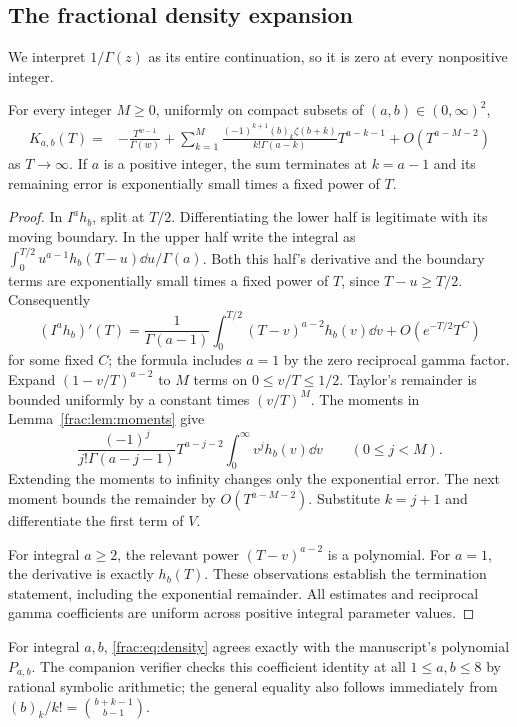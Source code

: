 \subsection{The fractional density expansion}

We interpret $1/\Gamma(z)$ as its entire continuation, so it is zero
at every nonpositive integer.

\begin{theorem}\label{frac:thm:density}
For every integer $M\ge0$, uniformly on compact subsets of
$(a,b)\in(0,\infty)^2$,
\begin{align}\label{frac:eq:density}
 K_{a,b}(T)={}&-\frac{T^{w-1}}{\Gamma(w)}
 +\sum_{k=1}^M
 \frac{(-1)^{k+1}(b)_k\zeta(b+k)}{k!\Gamma(a-k)}T^{a-k-1}
 +O(T^{a-M-2})
\end{align}
as $T\to\infty$. If $a$ is a positive integer, the sum terminates
at $k=a-1$ and its remaining error is exponentially small times
a fixed power of $T$.
\end{theorem}
\begin{proof}
In $I^ah_b$, split at $T/2$. Differentiating the lower half is
legitimate with its moving boundary. In the upper half write the
integral as $\int_0^{T/2}u^{a-1}h_b(T-u)\dd u/\Gamma(a)$.
Both this half's derivative and the boundary terms are exponentially
small times a fixed power of $T$, since $T-u\ge T/2$. Consequently
\[
 (I^ah_b)'(T)=\frac1{\Gamma(a-1)}
     \int_0^{T/2}(T-v)^{a-2}h_b(v)\dd v
       +O(e^{-T/2}T^C)
\]
for some fixed $C$; the formula includes $a=1$ by the zero reciprocal
gamma factor. Expand $(1-v/T)^{a-2}$ to $M$ terms on $0\le v/T\le1/2$.
Taylor's remainder is bounded uniformly by a constant times
$(v/T)^M$. The moments in Lemma~\ref{frac:lem:moments} give
\[
 \frac{(-1)^j}{j!\Gamma(a-j-1)}T^{a-j-2}
       \int_0^\infty v^j h_b(v)\dd v\qquad(0\le j<M).
\]
Extending the moments to infinity changes only the exponential error.
The next moment bounds the remainder by $O(T^{a-M-2})$.
Substitute $k=j+1$ and differentiate the first term of $V$.

For integral $a\ge2$, the relevant power $(T-v)^{a-2}$ is a
polynomial. For $a=1$, the derivative is exactly $h_b(T)$.
These observations establish the termination statement, including
the exponential remainder. All estimates and reciprocal gamma
coefficients are uniform across positive integral parameter values.
\end{proof}

For integral $a,b$, \eqref{frac:eq:density} agrees exactly with the
manuscript's polynomial $P_{a,b}$. The companion verifier checks this
coefficient identity at all $1\le a,b\le8$ by rational symbolic
arithmetic; the general equality also follows immediately from
$ (b)_k/k!=\binom{b+k-1}{b-1}$.


